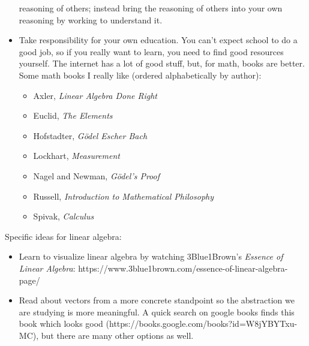 \documentclass[12pt]{article}
\begin{document}
\begin{itemize}
    reasoning of others; instead bring the reasoning of others into
    your own reasoning by working to understand it.
  \item Take responsibility for your own education.  You can't expect
    school to do a good job, so if you really want to learn, you need
    to find good resources yourself.  The internet has a lot of good
    stuff, but, for math, books are better.  Some math books I really
    like (ordered alphabetically by author):
    \begin{itemize}
    \item Axler, \textit{Linear Algebra Done Right}
    \item Euclid, \textit{The Elements}
    \item Hofstadter, \textit{G\"{o}del Escher Bach}
    \item Lockhart, \textit{Measurement}
    \item Nagel and Newman, \textit{G\"{o}del's Proof}
    \item Russell, \textit{Introduction to Mathematical Philosophy}
    \item Spivak, \textit{Calculus}
    \end{itemize}
\end{itemize}

Specific ideas for linear algebra:
\begin{itemize}
  \item Learn to visualize linear algebra by watching 3Blue1Brown's
    \textit{Essence of Linear Algebra}:
    https://www.3blue1brown.com/essence-of-linear-algebra-page/
  \item Read about vectors from a more concrete standpoint so the
    abstraction we are studying is more meaningful.  A quick search on
    google books finds this book which looks good
    (https://books.google.com/books?id=W8jYBYTxu-MC),
    but there are many other options as well.
\end{itemize}
\end{document}
